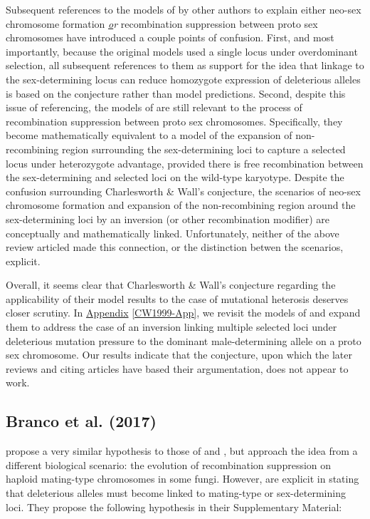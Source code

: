 \documentclass{article}
\begin{document}
\begin{appendices}
\noindent Subsequent references to the models of \citet{CharlesworthWall1999} by other authors to explain either neo-sex chromosome formation {\itshape \underline or} recombination suppression between proto sex chromosomes have introduced a couple points of confusion. First, and most importantly, because the original models used a single locus under overdominant selection, all subsequent references to them as support for the idea that linkage to the sex-determining locus can reduce homozygote expression of deleterious alleles is based on the conjecture rather than model predictions. Second, despite this issue of referencing, the models of \citet{CharlesworthWall1999} are still relevant to the process of recombination suppression between proto sex chromosomes. Specifically, they become mathematically equivalent to a model of the expansion of non-recombining region surrounding the sex-determining loci to capture a selected locus under heterozygote advantage, provided there is free recombination between the sex-determining and selected loci on the wild-type karyotype. Despite the confusion surrounding Charlesworth \& Wall's conjecture, the scenarios of neo-sex chromosome formation and expansion of the non-recombining region around the sex-determining loci by an inversion (or other recombination modifier) are conceptually and mathematically linked. Unfortunately, neither of the above review articled made this connection, or the distinction betwen the scenarios, explicit. 

Overall, it seems clear that Charlesworth \& Wall's conjecture regarding the applicability of their model results to the case of mutational heterosis deserves closer scrutiny. In \hyperref[CW1999-App]{Appendix} \ref{CW1999-App}, we revisit the models of \citet{CharlesworthWall1999} and expand them to address the case of an inversion linking multiple selected loci under deleterious mutation pressure to the dominant male-determining allele on a proto sex chromosome. Our results indicate that the conjecture, upon which the later reviews and citing articles have based their argumentation, does not appear to work.


\subsection*{Branco et al. (2017)}

\citet{Branco2017} propose a very similar hypothesis to those of \citet{Ironside2010} and \citet{Ponnikas2018}, but approach the idea from a different biological scenario: the evolution of recombination suppression on haploid mating-type chromosomes in some fungi. However, \citet{Branco2017} are explicit in stating that deleterious alleles must become linked to mating-type or sex-determining loci. They propose the following hypothesis in their Supplementary Material:


\end{appendices}
\end{document}
